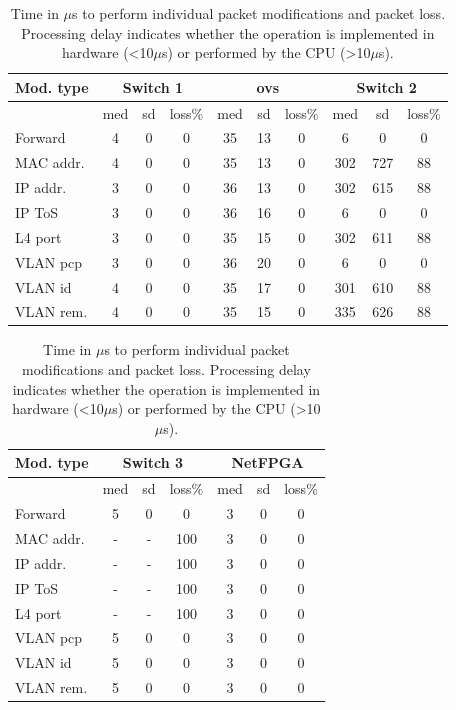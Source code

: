 \begin{table}[tb]
\begin{flushleft}
        \begin{tabular}[t]{ |l | c | c | c || c | c | c  || c | c | c | }
          \hline                       
          Mod. type & \multicolumn{3}{|c|}{Switch 1} & \multicolumn{3}{|c|}{ovs} &
          \multicolumn{3}{|c|}{Switch 2} \\ 
          \hline                       
          & med & sd & loss\%  & med & sd & loss\% & med & sd & loss\%\\
          \hline  
          Forward & 4 & 0 & 0 & 35 & 13 & 0& 6 & 0 & 0 \\
          \hline  
          MAC addr. & 4 & 0 & 0 & 35 & 13 & 0& 302 & 727 & 88\\
          \hline  
          IP addr. & 3 & 0 & 0 & 36 & 13 & 0 & 302 & 615 & 88\\
          \hline  
          IP ToS & 3 & 0 & 0 & 36 & 16 & 0 & 6 & 0 & 0\\
          \hline  
          L4 port & 3 & 0 & 0 & 35 & 15 & 0 & 302 & 611 &  88\\
          \hline  
          VLAN pcp & 3 & 0 & 0 & 36 & 20 & 0 & 6 & 0 & 0\\
          \hline  
          VLAN id & 4 & 0 & 0 & 35 & 17 & 0 & 301 & 610 & 88\\
          \hline  
          VLAN rem. & 4 & 0 & 0 & 35 & 15 & 0 & 335 & 626 & 88\\
      \hline
    \end{tabular}
   \begin{tabular}[t]{ |l | c | c | c || c | c | c | }
          \hline                       
          Mod. type & \multicolumn{3}{|c|}{Switch 3} & \multicolumn{3}{|c|}{NetFPGA}\\ 
          \hline                       
          & med & sd & loss\%  & med & sd & loss\% \\
          \hline  
          Forward & 5 & 0 & 0 & 3 & 0 & 0 \\
          \hline  
          MAC addr. & - & - & 100 & 3 & 0 & 0 \\
          \hline  
          IP addr. & - & - &  100 & 3 & 0 & 0 \\
          \hline  
          IP ToS & - & - & 100 & 3 & 0 & 0 \\
          \hline  
          L4 port & - & - & 100 & 3 & 0 & 0 \\
          \hline  
          VLAN pcp & 5 & 0 & 0 & 3 & 0 & 0 \\
          \hline  
          VLAN id & 5 & 0 & 0 & 3 & 0 & 0  \\
          \hline  
          VLAN rem. & 5 & 0 & 0 & 3 & 0 & 0 \\
      \hline
    \end{tabular}
 
\caption{Time in $\mu$s to perform individual packet modifications and packet
loss. Processing delay indicates whether the operation is
  implemented in hardware (\textless10$\mu$s) or performed by the CPU (\textgreater10$\mu$s).}
  \label{tbl:feature_delay}
\end{flushleft}
\end{table}
